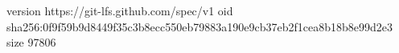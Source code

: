 version https://git-lfs.github.com/spec/v1
oid sha256:0f9f59b9d8449f35c3b8ecc550eb79883a190e9cb37eb2f1cea8b18b8e99d2e3
size 97806
